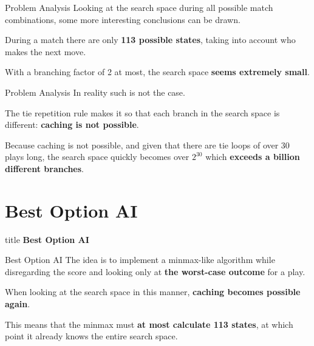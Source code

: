 \documentclass[11pt]{beamer}
\begin{document}
\begin{frame}{Problem Analysis}
	Looking at the search space during all possible match combinations,
	some more interesting conclusions can be drawn.

	\bigskip

	During a match there are only \textbf{113 possible states}, taking into account who makes the next move.

	\bigskip

	With a branching factor of 2 at most, the search space \textbf{seems extremely small}.
\end{frame}

\begin{frame}{Problem Analysis}
	In reality such is not the case.

	\bigskip

	The tie repetition rule makes it so that each branch in the search space is different: \textbf{caching is not possible}.

	\bigskip

	Because caching is not possible, and given that there are tie loops of over 30 plays long,
	the search space quickly becomes over $2^{30}$ which \textbf{exceeds a billion different branches}.
\end{frame}



\section{Best Option AI}

\begin{frame}
    \begin{beamercolorbox}[sep=8pt,center,rounded=true,shadow=true]{title}
		\Huge\textbf{Best Option AI}
    \end{beamercolorbox}
\end{frame}

\begin{frame}{Best Option AI}
	The idea is to implement a minmax-like algorithm while disregarding the score and
	looking only at \textbf{the worst-case outcome} for a play.

	\bigskip

	When looking at the search space in this manner, \textbf{caching becomes possible again}.

	\bigskip

	This means that the minmax must \textbf{at most calculate 113 states}, at which point it
	already knows the entire search space.
\end{frame}
\end{document}
